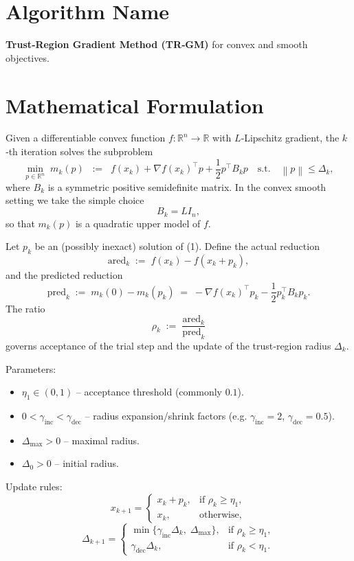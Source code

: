 \documentclass{article}
\newcommand{\norm}[1]{\left\lVert#1\right\rVert}
\begin{document}
\section*{Algorithm Name}
\textbf{Trust‑Region Gradient Method (TR‑GM)} for convex and smooth objectives.

\section*{Mathematical Formulation}
Given a differentiable convex function $f:\mathbb{R}^n\to\mathbb{R}$ with $L$‑Lipschitz gradient, the $k$‑th iteration solves the subproblem
\[
\min_{p\in\mathbb{R}^n}\; m_k(p)\;\;:=\;\;f(x_k)+\nabla f(x_k)^{\top}p+\frac{1}{2}p^{\top}B_k p
\quad\text{s.t.}\quad \norm{p}\le \Delta_k,
\tag{1}
\]
where $B_k$ is a symmetric positive semidefinite matrix.  In the convex smooth setting we take the simple choice
\[
B_k = L I_n,
\tag{2}
\]
so that $m_k(p)$ is a quadratic upper model of $f$.

Let $p_k$ be an (possibly inexact) solution of (1).  Define the actual reduction
\[
\text{ared}_k \;:=\; f(x_k)-f(x_k+p_k),
\]
and the predicted reduction
\[
\text{pred}_k \;:=\; m_k(0)-m_k(p_k)
            \;=\; -\nabla f(x_k)^{\top}p_k-\frac12 p_k^{\top}B_k p_k .
\]
The ratio
\[
\rho_k \;:=\; \frac{\text{ared}_k}{\text{pred}_k}
\tag{3}
\]
governs acceptance of the trial step and the update of the trust‑region radius $\Delta_k$.

Parameters:
\begin{itemize}[nosep]
\item $\eta_1\in(0,1)$ – acceptance threshold (commonly $0.1$).
\item $0<\gamma_{\text{inc}}<\gamma_{\text{dec}}$ – radius expansion/shrink factors (e.g. $\gamma_{\text{inc}}=2$, $\gamma_{\text{dec}}=0.5$).
\item $\Delta_{\max}>0$ – maximal radius.
\item $\Delta_0>0$ – initial radius.
\end{itemize}

Update rules:
\[
x_{k+1}= 
\begin{cases}
x_k+p_k, & \text{if }\rho_k\ge \eta_1,\\[4pt]
x_k,    & \text{otherwise},
\end{cases}
\tag{4}
\]
\[
\Delta_{k+1}= 
\begin{cases}
\min\{\gamma_{\text{inc}}\Delta_k,\;\Delta_{\max}\}, & \text{if }\rho_k\ge \eta_1,\\[4pt]
\gamma_{\text{dec}}\Delta_k, & \text{if }\rho_k<\eta_1 .
\end{cases}
\tag{5}
\]
\end{document}

